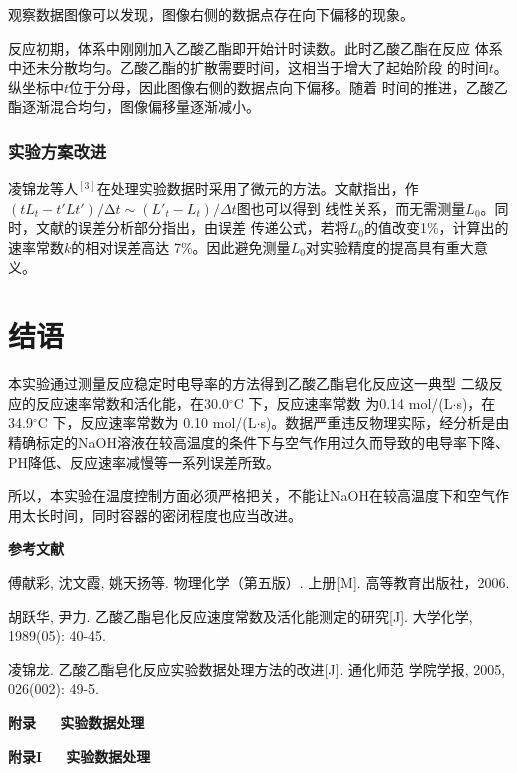\documentclass[12pt]{ctexart}
\numberwithin{equation}{section}
\begin{document}
观察数据图像可以发现，图像右侧的数据点存在向下偏移的现象。

反应初期，体系中刚刚加入乙酸乙酯即开始计时读数。此时乙酸乙酯在反应
体系中还未分散均匀。乙酸乙酯的扩散需要时间，这相当于增大了起始阶段
的时间$t$。纵坐标中$t$位于分母，因此图像右侧的数据点向下偏移。随着
时间的推进，乙酸乙酯逐渐混合均匀，图像偏移量逐渐减小。

\subsubsection{实验方案改进}

凌锦龙等人$^{[3]}$在处理实验数据时采用了微元的方法。文献指出，作
$(tL_t − t′Lt′)/∆t \sim (L′_t − L_t)/\Delta t$图也可以得到
线性关系，而无需测量$L_0$。同时，文献的误差分析部分指出，由误差
传递公式，若将$L_0$的值改变1\%，计算出的速率常数$k$的相对误差高达
7\%。因此避免测量$L_0$对实验精度的提高具有重大意义。

\section{结语}

本实验通过测量反应稳定时电导率的方法得到乙酸乙酯皂化反应这一典型
二级反应的反应速率常数和活化能，在30.0$^\circ$C 下，反应速率常数
为0.14 mol/(L$\cdot$s)，在34.9$^\circ$C 下，反应速率常数为
0.10 mol/(L$\cdot$s)。数据严重违反物理实际，经分析是由精确标定的NaOH溶液在较高温度的条件下与空气作用过久而导致的电导率下降、PH降低、反应速率减慢等一系列误差所致。

所以，本实验在温度控制方面必须严格把关，不能让NaOH在较高温度下和空气作用太长时间，同时容器的密闭程度也应当改进。
\pagebreak
\begin{center}
    \Large\bfseries{参考文献}
\end{center}
\noindent
[1] 傅献彩, 沈文霞, 姚天扬等. 物理化学（第五版）. 上册[M].
高等教育出版社，2006.

\noindent
[2] 胡跃华, 尹力. 乙酸乙酯皂化反应速度常数及活化能测定的研究[J].
大学化学, 1989(05): 40-45.

\noindent
[3] 凌锦龙. 乙酸乙酯皂化反应实验数据处理方法的改进[J]. 通化师范
学院学报, 2005, 026(002): 49-5.

\newpage

\begin{center}
    \LARGE\bfseries{附录~~~实验数据处理}
\end{center}
\begin{center}
    \Large\bfseries{附录I~~~实验数据处理}
\end{center}
\end{document}
